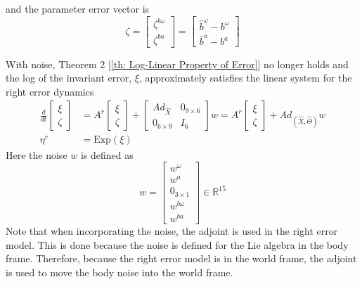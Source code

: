 and the parameter error vector is
\begin{equation}
    \zeta = 
        \begin{bmatrix}
            \zeta^{b \omega} \\
            \zeta^{b a}
        \end{bmatrix}
        =
        \begin{bmatrix}
            \hat{b}^{\omega} - b^{\omega} \\
            \hat{b}^a - b^a
        \end{bmatrix}
    \label{eq: zeta error full}
\end{equation}

With noise, Theorem 2 [\ref{th: Log-Linear Property of Error}] no longer holds and the log of the invariant error, $\xi$, approximately satisfies the linear system for the right error dynamics \cite{Contact-Aided_Invarant_EKF}
\begin{subequations}
    \begin{align}
        \frac{d}{dt} \begin{bmatrix}
            \xi \\
            \zeta
        \end{bmatrix} &= A^r \begin{bmatrix}
            \xi \\
            \zeta
        \end{bmatrix}  + \begin{bmatrix}
            Ad_{\hat{X}} & 0_{9 \times 6} \\
            0_{6 \times 9} & I_6
        \end{bmatrix} w  = A^r \begin{bmatrix}
            \xi \\
            \zeta
        \end{bmatrix} + Ad_{(\hat{X},\hat{\Theta})} w\label{eq: updated adjoint}\\
        \eta^r &= \text{Exp}(\xi) \label{eq: ct right xi diffEq}
    \end{align}
\end{subequations}
Here the noise $w$ is defined as
\begin{equation}
    w = \begin{bmatrix}
    w^{\omega} \\
    w^{a} \\
    0_{3 \times 1} \\
    w^{b \omega} \\
    w^{b a}
    \end{bmatrix} \in \mathbb{R}^{15}
    \label{eq: w RInEKF}
\end{equation}
Note that when incorporating the noise, the adjoint is used in the right error model. This is done because the noise is defined for the Lie algebra in the body frame. Therefore, because the right error model is in the world frame, the adjoint is used to move the body noise into the world frame. 

